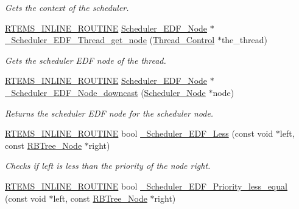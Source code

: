 \begin{DoxyCompactItemize}
\begin{DoxyCompactList}\small\item\em Gets the context of the scheduler. \end{DoxyCompactList}\item 
\mbox{\hyperlink{group__RTEMSScoreBaseDefs_gac216239df231d5dbd15e3520b0b9313f}{R\+T\+E\+M\+S\+\_\+\+I\+N\+L\+I\+N\+E\+\_\+\+R\+O\+U\+T\+I\+NE}} \mbox{\hyperlink{structScheduler__EDF__Node}{Scheduler\+\_\+\+E\+D\+F\+\_\+\+Node}} $\ast$ \mbox{\hyperlink{group__RTEMSScoreSchedulerEDF_gae2e85339fc623dca9d51dd8ae3826f4a}{\+\_\+\+Scheduler\+\_\+\+E\+D\+F\+\_\+\+Thread\+\_\+get\+\_\+node}} (\mbox{\hyperlink{struct__Thread__Control}{Thread\+\_\+\+Control}} $\ast$the\+\_\+thread)
\begin{DoxyCompactList}\small\item\em Gets the scheduler E\+DF node of the thread. \end{DoxyCompactList}\item 
\mbox{\hyperlink{group__RTEMSScoreBaseDefs_gac216239df231d5dbd15e3520b0b9313f}{R\+T\+E\+M\+S\+\_\+\+I\+N\+L\+I\+N\+E\+\_\+\+R\+O\+U\+T\+I\+NE}} \mbox{\hyperlink{structScheduler__EDF__Node}{Scheduler\+\_\+\+E\+D\+F\+\_\+\+Node}} $\ast$ \mbox{\hyperlink{group__RTEMSScoreSchedulerEDF_gaea9b538d93951ca5e84d203fc274b8db}{\+\_\+\+Scheduler\+\_\+\+E\+D\+F\+\_\+\+Node\+\_\+downcast}} (\mbox{\hyperlink{structScheduler__Node}{Scheduler\+\_\+\+Node}} $\ast$node)
\begin{DoxyCompactList}\small\item\em Returns the scheduler E\+DF node for the scheduler node. \end{DoxyCompactList}\item 
\mbox{\hyperlink{group__RTEMSScoreBaseDefs_gac216239df231d5dbd15e3520b0b9313f}{R\+T\+E\+M\+S\+\_\+\+I\+N\+L\+I\+N\+E\+\_\+\+R\+O\+U\+T\+I\+NE}} bool \mbox{\hyperlink{group__RTEMSScoreSchedulerEDF_gaab4da8d09d44a461c48bfa4132784f71}{\+\_\+\+Scheduler\+\_\+\+E\+D\+F\+\_\+\+Less}} (const void $\ast$left, const \mbox{\hyperlink{structRBTree__Node}{R\+B\+Tree\+\_\+\+Node}} $\ast$right)
\begin{DoxyCompactList}\small\item\em Checks if {\itshape left} is less than the priority of the node {\itshape right}. \end{DoxyCompactList}\item 
\mbox{\hyperlink{group__RTEMSScoreBaseDefs_gac216239df231d5dbd15e3520b0b9313f}{R\+T\+E\+M\+S\+\_\+\+I\+N\+L\+I\+N\+E\+\_\+\+R\+O\+U\+T\+I\+NE}} bool \mbox{\hyperlink{group__RTEMSScoreSchedulerEDF_ga4ca8e1bd12d09d46e7f7838c6aebe004}{\+\_\+\+Scheduler\+\_\+\+E\+D\+F\+\_\+\+Priority\+\_\+less\+\_\+equal}} (const void $\ast$left, const \mbox{\hyperlink{structRBTree__Node}{R\+B\+Tree\+\_\+\+Node}} $\ast$right)

\end{DoxyCompactItemize}

